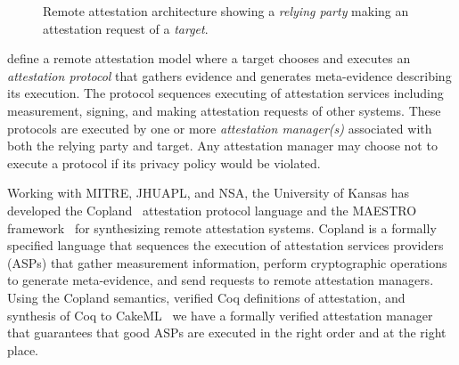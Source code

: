 \documentclass[runningheads]{llncs}
\begin{document}
\begin{figure}[hbtp]
  \centering
  \caption{Remote attestation architecture
  showing a \emph{relying party} making an attestation request of a
  \emph{target}.}
  \label{fig:remote-attestation}
\end{figure}

\citet{Coker::Principles-of-R,Coker:08:Attestation:-Ev} define a remote
attestation model where a target chooses and executes an \emph{attestation
protocol} that gathers evidence and generates meta-evidence describing its
execution. The protocol sequences executing of attestation services including
measurement, signing, and making attestation requests of other systems.  These
protocols are executed by one or more \emph{attestation manager(s)} associated
with both the relying party and target.  Any attestation manager may choose not
to execute a protocol if its privacy policy would be violated.

Working with MITRE, JHUAPL, and NSA, the University of Kansas has developed the
Copland~\citep{Ramsdell:2019aa} attestation protocol language and the MAESTRO
framework~\citep{petz2022innovations,
Petz:2024:Verified-Configuration-and-Deployment-Paper} for synthesizing remote
attestation systems. Copland is a formally specified language that sequences the
execution of attestation services providers (ASPs) that gather measurement
information, perform cryptographic operations to generate meta-evidence, and
send requests to remote attestation managers. Using the Copland semantics,
verified Coq definitions of attestation, and synthesis of Coq to
CakeML~\citep{Kumar:2014:CVI:2535838.2535841} we have a formally verified
attestation manager that guarantees that good ASPs are executed in the right
order and at the right place.
\end{document}
